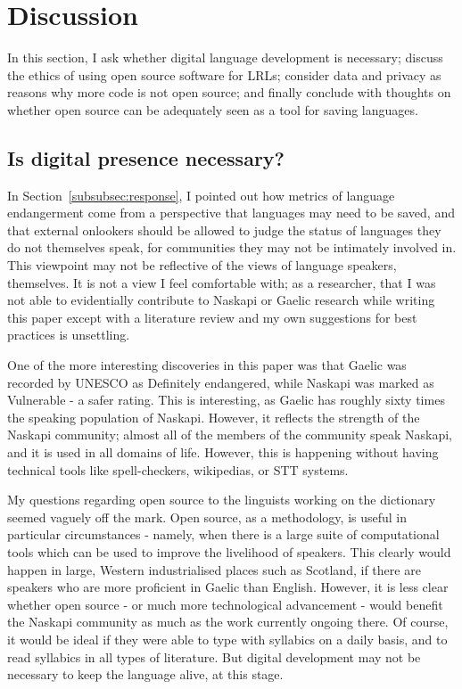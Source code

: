 \section{Discussion}
\label{sec:discussion}

In this section, I ask whether digital language development is necessary; discuss the ethics of using open source software for LRLs; consider data and privacy as reasons why more code is not open source; and finally conclude with thoughts on whether open source can be adequately seen as a tool for saving languages.

\subsection{Is digital presence necessary?}

In Section~\ref{subsubsec:response}, I pointed out how metrics of language endangerment come from a perspective that languages may need to be saved, and that external onlookers should be allowed to judge the status of languages they do not themselves speak, for communities they may not be intimately involved in. This viewpoint may not be reflective of the views of language speakers, themselves. It is not a view I feel comfortable with; as a researcher, that I was not able to evidentially contribute to Naskapi or Gaelic research while writing this paper except with a literature review and my own suggestions for best practices is unsettling. 

One of the more interesting discoveries in this paper was that Gaelic was recorded by UNESCO as Definitely endangered, while Naskapi was marked as Vulnerable - a safer rating. This is interesting, as Gaelic has roughly sixty times the speaking population of Naskapi. However, it reflects the strength of the Naskapi community; almost all of the members of the community speak Naskapi, and it is used in all domains of life. However, this is happening without having technical tools like spell-checkers, wikipedias, or STT systems. 

My questions regarding open source to the linguists working on the dictionary seemed vaguely off the mark. Open source, as a methodology, is useful in particular circumstances - namely, when there is a large suite of computational tools which can be used to improve the livelihood of speakers. This clearly would happen in large, Western industrialised places such as Scotland, if there are speakers who are more proficient in Gaelic than English. However, it is less clear whether open source - or much more technological advancement - would benefit the Naskapi community as much as the work currently ongoing there. Of course, it would be ideal if they were able to type with syllabics on a daily basis, and to read syllabics in all types of literature. But digital development may not be necessary to keep the language alive, at this stage. 

